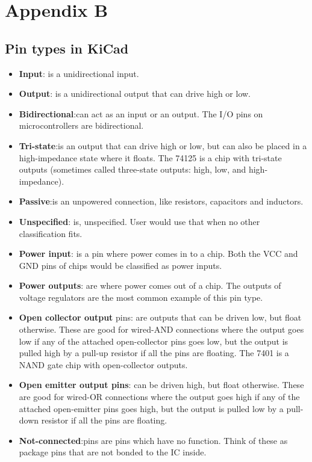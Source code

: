 \section{Appendix B}

\subsection{Pin types in KiCad}


\begin{itemize}

\item {\textbf {Input}}: is a unidirectional input.
\item {\textbf {Output}}: is a unidirectional output that can drive high or low.
\item {\textbf {Bidirectional}}:can act as an input or an output. The I/O pins on microcontrollers are bidirectional.
\item {\textbf {Tri-state}}:is an output that can drive high or low, but can also be placed in a high-impedance state where it floats. The 74125 is a chip with tri-state outputs (sometimes called three-state outputs: high, low, and high-impedance).
\item {\textbf {Passive}}:is an unpowered connection, like resistors, capacitors and inductors.
\item {\textbf{Unspecified}}: is, unspecified. User would use that when no other classification fits.
\item {\textbf{Power input}}: is a pin where power comes in to a chip. Both the VCC and GND pins of chips would be classified as power inputs.
\item {\textbf {Power outputs}}: are where power comes out of a chip. The outputs of voltage regulators are the most common example of this pin type.
\item {\textbf {Open collector output}} pins: are outputs that can be driven low, but float 	otherwise. These are good for wired-AND connections where the output 	goes low if any of the attached open-collector pins goes low, but 	the output is pulled high by a pull-up resistor if all the pins are floating. The 7401 is a NAND gate chip with open-collector outputs.
\item {\textbf{Open emitter output pins}}: can be driven high, but float otherwise. These 	are good for wired-OR connections where the output goes high if any 	of the attached open-emitter pins goes high, but the output is pulled low by a pull-down resistor if all the pins are floating.
\item {\textbf{ Not-connected}}:pins are pins which have no function. Think of these as package pins that are not bonded to the IC inside.
 \end{itemize}


